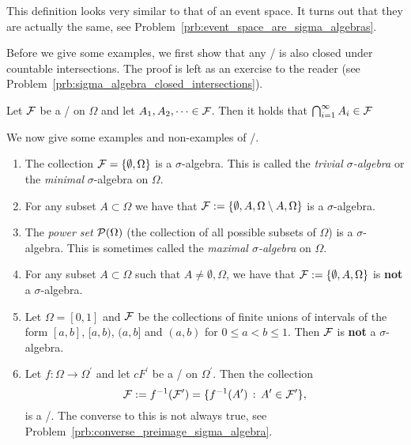 This definition looks very similar to that of an event space. It turns out that they are actually the same, see Problem~\ref{prb:event_space_are_sigma_algebras}.

Before we give some examples, we first show that any \sigalg/ is also closed under countable intersections. The proof is left as an exercise to the reader (see Problem~\ref{prb:sigma_algebra_closed_intersections}).

\begin{lemma}\label{lem:sigma_algebra_closed_intersections}
Let $\mathcal F$ be a \sigalg/ on $\Omega$ and let $A_1, A_2, \dots \in \mathcal F$. Then it holds that $\bigcap_{i = 1}^\infty A_i \in \mathcal F$
\end{lemma}

We now give some examples and non-examples of \sigalgs/.

\begin{example}\label{example:sigma_algebras}
\hfil
\begin{enumerate}
\item The collection $\mathcal F = \{\emptyset, \Omega\}$ is a $\sigma$-algebra. This is called the \emph{trivial $\sigma$-algebra} or the \emph{minimal} $\sigma$-algebra on $\Omega$.
\item For any subset $A \subset \Omega$ we have that $\mathcal F := \{\emptyset, A, \Omega\setminus A, \Omega\}$ is a $\sigma$-algebra.
\item The \emph{power set} $\mathcal P(\Omega)$ (the collection of all possible subsets of $\Omega$) is a $\sigma$-algebra. This is sometimes called the \emph{maximal $\sigma$-algebra} on $\Omega$.
\item For any subset $A \subset \Omega$ such that $A \ne \emptyset, \Omega$, we have that $\mathcal F := \{\emptyset, A, \Omega\}$ is \textbf{not} a $\sigma$-algebra.
\item Let $\Omega = [0,1]$ and $\mathcal F$ be the collections of finite unions of intervals of the form $[a,b]$, $[a,b)$, $(a,b]$ and $(a,b)$ for $0 \le a < b \le 1$. Then $\mathcal F$ is \textbf{not} a $\sigma$-algebra.
\item Let $f : \Omega \to \Omega^\prime$ and let $cF^\prime$ be a \sigalg/ on $\Omega^\prime$. Then the collection
\[
	\mathcal F := f^{-1}(\mathcal F^\prime) = \{f^{-1}(A^\prime) \, : \, A^\prime \in \mathcal F^\prime\},
\]
is a \sigalg/. The converse to this is not always true, see Problem~\ref{prb:converse_preimage_sigma_algebra}.
\end{enumerate}
\end{example}

